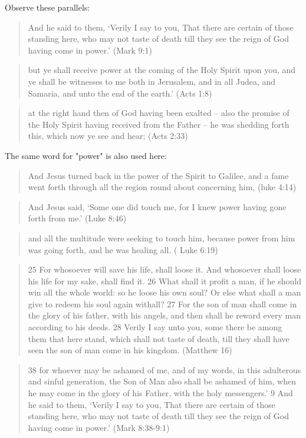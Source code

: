 \documentclass[11pt]{article}
\begin{document}
Observe these parallels:
\begin{quote}
And he said to them, ‘Verily I say to you, That there are certain of those standing here, who may not taste of death till they see the reign of God having come in power.’ (Mark 9:1)
\end{quote}
\begin{quote}
but ye shall receive power at the coming of the Holy Spirit upon you, and ye shall be witnesses to me both in Jerusalem, and in all Judea, and Samaria, and unto the end of the earth.' (Acts 1:8)
\end{quote}
\begin{quote}
at the right hand then of God having been exalted -- also the promise of the Holy Spirit having received from the Father -- he was shedding forth this, which now ye see and hear; (Acts 2:33)
\end{quote}
The same word for "power" is also used here:
\begin{quote}
And Jesus turned back in the power of the Spirit to Galilee, and a fame went forth through all the region round about concerning him, (luke 4:14) 
\end{quote}
\begin{quote}
And Jesus said, `Some one did touch me, for I knew power having gone forth from me.'  (Luke 8:46)
\end{quote}
\begin{quote}
and all the multitude were seeking to touch him, because power from him was going forth, and he was healing all.  ( Luke 6:19)
\end{quote}
\begin{quote}
25 For whosoever will save his life, shall loose it. And whosoever shall loose his life for my sake, shall find it. 26 What shall it profit a man, if he should win all the whole world: so he loose his own soul? Or else what shall a man give to redeem his soul again withall? 27 For the son of man shall come in the glory of his father, with his angels, and then shall he reward every man according to his deeds. 28 Verily I say unto you, some there be among them that here stand, which shall not taste of death, till they shall have seen the son of man come in his kingdom. (Matthew 16)
\end{quote}
\begin{quote}
38 for whoever may be ashamed of me, and of my words, in this adulterous and sinful generation, the Son of Man also shall be ashamed of him, when he may come in the glory of his Father, with the holy messengers.'
9 And he said to them, `Verily I say to you, That there are certain of those standing here, who may not taste of death till they see the reign of God having come in power.' (Mark 8:38-9:1)
\end{quote}
\end{document}
